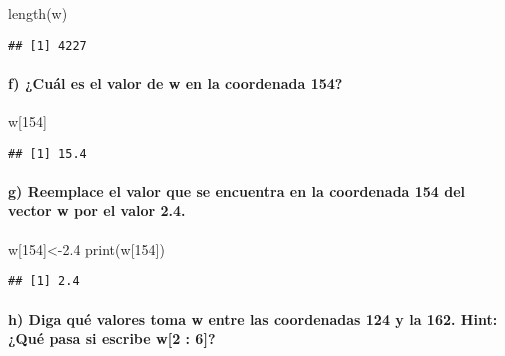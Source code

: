 \documentclass[
]{article}
\newenvironment{Shaded}{\begin{snugshade}}{\end{snugshade}}
\newcommand{\DecValTok}[1]{\textcolor[rgb]{0.00,0.00,0.81}{#1}}
\newcommand{\FloatTok}[1]{\textcolor[rgb]{0.00,0.00,0.81}{#1}}
\newcommand{\FunctionTok}[1]{\textcolor[rgb]{0.00,0.00,0.00}{#1}}
\newcommand{\NormalTok}[1]{#1}
\newcommand{\OtherTok}[1]{\textcolor[rgb]{0.56,0.35,0.01}{#1}}
\begin{document}
\begin{Shaded}
\begin{Highlighting}[]
\FunctionTok{length}\NormalTok{(w)}
\end{Highlighting}
\end{Shaded}

\begin{verbatim}
## [1] 4227
\end{verbatim}

\hypertarget{f-cuuxe1l-es-el-valor-de-w-en-la-coordenada-154}{%
\paragraph{f) ¿Cuál es el valor de w en la coordenada
154?}\label{f-cuuxe1l-es-el-valor-de-w-en-la-coordenada-154}}

\begin{Shaded}
\begin{Highlighting}[]
\NormalTok{w[}\DecValTok{154}\NormalTok{]}
\end{Highlighting}
\end{Shaded}

\begin{verbatim}
## [1] 15.4
\end{verbatim}

\hypertarget{g-reemplace-el-valor-que-se-encuentra-en-la-coordenada-154-del-vector-w-por-el-valor-2.4.}{%
\paragraph{g) Reemplace el valor que se encuentra en la coordenada 154
del vector w por el valor
2.4.}\label{g-reemplace-el-valor-que-se-encuentra-en-la-coordenada-154-del-vector-w-por-el-valor-2.4.}}

\begin{Shaded}
\begin{Highlighting}[]
\NormalTok{w[}\DecValTok{154}\NormalTok{]}\OtherTok{\textless{}{-}}\FloatTok{2.4}
\FunctionTok{print}\NormalTok{(w[}\DecValTok{154}\NormalTok{])}
\end{Highlighting}
\end{Shaded}

\begin{verbatim}
## [1] 2.4
\end{verbatim}

\hypertarget{h-diga-quuxe9-valores-toma-w-entre-las-coordenadas-124-y-la-162.-hint-quuxe9-pasa-si-escribe-w2-6}{%
\paragraph{h) Diga qué valores toma w entre las coordenadas 124 y la
162. Hint: ¿Qué pasa si escribe w{[}2 :
6{]}?}\label{h-diga-quuxe9-valores-toma-w-entre-las-coordenadas-124-y-la-162.-hint-quuxe9-pasa-si-escribe-w2-6}}
\end{document}
